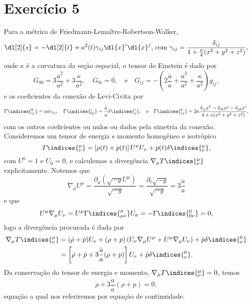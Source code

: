\section*{Exercício 5}
Para a métrica de Friedmann-Lemaître-Robertson-Walker,
\begin{equation*}
    \dl[2]{s} = -\dl[2]{t} + a^2(t) \gamma_{ij} \dl{x}^i\dl{x}^j\text{, com }\gamma_{ij} = \frac{\delta_{ij}}{1 + \frac{\kappa}4(x^2 + y^2 + z^2)},
\end{equation*}
onde \(\kappa\) é a curvatura da seção espacial, o tensor de Einstein é dado por
\begin{equation*}
    G_{00} = 3\frac{\dot{a}^2}{a^2} + 3\frac{\kappa}{a^2},\quad
    G_{0i} = 0,\quad\text{e}\quad
    G_{ij} = - \left(2 \frac{\ddot{a}}{a} + \frac{\dot{a}^2}{a^2} + \frac{\kappa}{a^2}\right)g_{ij},
\end{equation*}
e os coeficientes da conexão de Levi-Civita por
\begin{equation*}
    \Gamma\indices{^0_{ij}} = a\dot{a} \gamma_{ij},\quad
    \Gamma\indices{^i_{0j}} = \frac{\dot{a}}{a} \delta\indices{^i_j},\quad\text{e}\quad
    \Gamma\indices{^k_{ij}} = 2\kappa \frac{\delta_{ij}x^k - \delta_{ik}x^j - \delta_{jk}x^i}{4 + \kappa(x^2 + y^2 + z^2)},
\end{equation*}
com os outros coeficientes ou nulos ou dados pela simetria da conexão. Consideremos um tensor de energia e momento homogêneo e isotrópico
\begin{equation*}
    T\indices{^\mu_\nu} = \left[\rho(t) + p(t)\right] U^\mu U_\nu + p(t) \delta\indices{^\mu_\nu},
\end{equation*}
com \(U^0 = 1\) e \(U_0 = 0\), e calculemos a divergência \(\nabla_\mu T\indices{^\mu_\nu}\) explicitamente. Notemos que
\begin{equation*}
    \nabla_\mu U^\mu = \frac{\partial_\mu (\sqrt{-g}U^\mu)}{\sqrt{-g}} = \frac{\partial_t\sqrt{-g}}{\sqrt{-g}} = 3\frac{\dot{a}}{a}
\end{equation*}
e que
\begin{equation*}
    U^\mu \nabla_\mu U_\nu = U^\mu \Gamma\indices{^\sigma_{\mu\nu}} U_\sigma = - \Gamma\indices{^0_{0\nu}} = 0,
\end{equation*}
logo a divergência procurada é dada por
\begin{align*}
    \nabla_\mu T\indices{^\mu_\nu} &= (\dot{\rho} + \dot{p})U_\nu + (\rho + p) \left(U_\nu \nabla_\mu U^\mu + U^\mu \nabla_\mu U_\nu\right) + \dot{p}\delta\indices{^0_\nu}\\
                                   &= \left[\dot\rho + \dot{p} + 3\frac{\dot{a}}{a}(\rho + p)\right]U_\nu + \dot{p} \delta\indices{^0_\nu}.
\end{align*}
Da conservação do tensor de energia e momento, \(\nabla_\mu T\indices{^\mu_\nu} = 0\), temos
\begin{equation*}
    \dot{\rho} + 3\frac{\dot{a}}{a}(\rho + p) = 0,
\end{equation*}
equação a qual nos referiremos por equação de continuidade.



